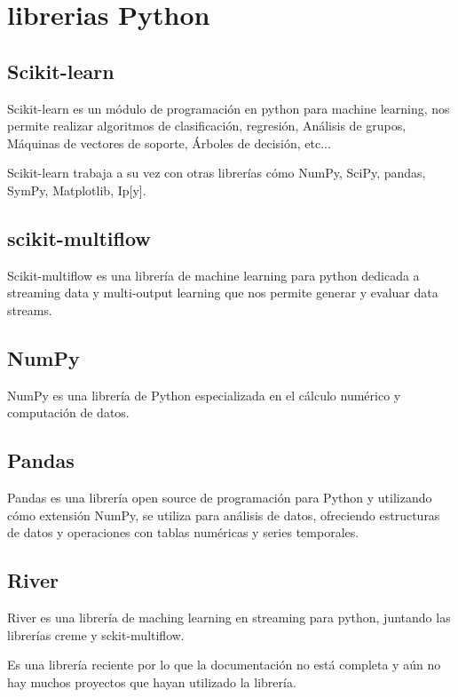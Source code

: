 \section{librerias Python}

\subsection{Scikit-learn}

Scikit-learn es un módulo de programación en python para machine learning, nos permite realizar algoritmos de clasificación, regresión, Análisis de grupos, Máquinas de vectores de soporte, Árboles de decisión, etc...

Scikit-learn trabaja a su vez con otras librerías cómo NumPy, SciPy, pandas, SymPy, Matplotlib, Ip[y].\cite{pagina:scikit-learn}

\subsection{scikit-multiflow}

Scikit-multiflow es una librería de machine learning para python dedicada a streaming data y multi-output learning que nos permite generar y evaluar data streams.\cite{pagina:scikit-mutliflow}

\subsection{NumPy}
NumPy es una librería de Python especializada en el cálculo numérico y computación de datos. 

\subsection{Pandas}

Pandas es una librería open source de programación para Python y utilizando cómo extensión NumPy, se utiliza para análisis de datos, ofreciendo estructuras de datos y operaciones con tablas numéricas y series temporales.\cite{pagina:wiki_pandas}


\subsection{River}
River es una librería de maching learning en streaming para python, juntando las librerías creme y sckit-multiflow.

Es una librería reciente por lo que la documentación no está completa y aún no hay muchos proyectos que hayan utilizado la librería.\cite{pagina:River}

